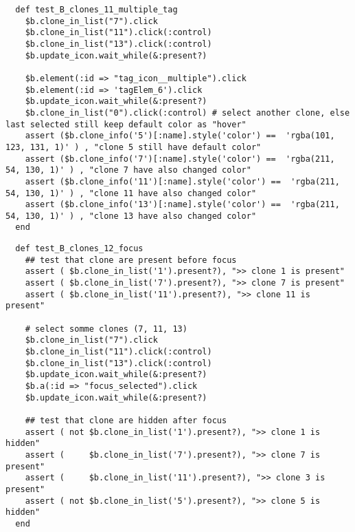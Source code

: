 \begin{verbatim}
  def test_B_clones_11_multiple_tag
    $b.clone_in_list("7").click
    $b.clone_in_list("11").click(:control)
    $b.clone_in_list("13").click(:control)
    $b.update_icon.wait_while(&:present?)

    $b.element(:id => "tag_icon__multiple").click
    $b.element(:id => 'tagElem_6').click
    $b.update_icon.wait_while(&:present?)
    $b.clone_in_list("0").click(:control) # select another clone, else last selected still keep default color as "hover"
    assert ($b.clone_info('5')[:name].style('color') ==  'rgba(101, 123, 131, 1)' ) , "clone 5 still have default color"
    assert ($b.clone_info('7')[:name].style('color') ==  'rgba(211, 54, 130, 1)' ) , "clone 7 have also changed color"
    assert ($b.clone_info('11')[:name].style('color') ==  'rgba(211, 54, 130, 1)' ) , "clone 11 have also changed color"
    assert ($b.clone_info('13')[:name].style('color') ==  'rgba(211, 54, 130, 1)' ) , "clone 13 have also changed color"
  end
\end{verbatim}

\begin{verbatim}
  def test_B_clones_12_focus
    ## test that clone are present before focus
    assert ( $b.clone_in_list('1').present?), ">> clone 1 is present"
    assert ( $b.clone_in_list('7').present?), ">> clone 7 is present"
    assert ( $b.clone_in_list('11').present?), ">> clone 11 is present"
    
    # select somme clones (7, 11, 13)
    $b.clone_in_list("7").click
    $b.clone_in_list("11").click(:control)
    $b.clone_in_list("13").click(:control)
    $b.update_icon.wait_while(&:present?)
    $b.a(:id => "focus_selected").click
    $b.update_icon.wait_while(&:present?)

    ## test that clone are hidden after focus
    assert ( not $b.clone_in_list('1').present?), ">> clone 1 is hidden"
    assert (     $b.clone_in_list('7').present?), ">> clone 7 is present"
    assert (     $b.clone_in_list('11').present?), ">> clone 3 is present"
    assert ( not $b.clone_in_list('5').present?), ">> clone 5 is hidden"
  end
\end{verbatim}

